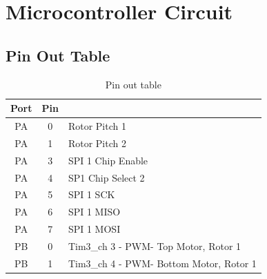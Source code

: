 \chapter{Microcontroller Circuit}
\label{sec: Microcontroller_circuit}
\section{Pin Out Table}
\begin{table}[H]
    \centering
    \small
    \caption{Pin out table}
    \begin{tabular}{|c|c|l|}
    \hline
    \rowcolor[HTML]{EFEFEF} 
    {\color[HTML]{333333} \textbf{Port}} & {\color[HTML]{333333} \textbf{Pin}} & \multicolumn{1}{c|}{\cellcolor[HTML]{EFEFEF}{\color[HTML]{333333} \textbf{Function}}} \\ \hline
    PA                                   & 0                                   & Rotor Pitch 1                                                                         \\ \hline
    PA                                   & 1                                   & Rotor Pitch 2                                                                         \\ \hline
    PA                                   & 3                                   & SPI 1 Chip Enable                                                                     \\ \hline
    PA                                   & 4                                   & SP1   Chip Select 2                                                                   \\ \hline
    PA                                   & 5                                   & SPI 1 SCK                                                                             \\ \hline
    PA                                   & 6                                   & SPI   1 MISO                                                                          \\ \hline
    PA                                   & 7                                   & SPI 1 MOSI                                                                            \\ \hline
    PB                                   & 0                                   & Tim3\_ch 3 - PWM- Top Motor, Rotor   1                                                \\ \hline
    PB                                   & 1                                   & Tim3\_ch 4 - PWM- Bottom Motor,  Rotor 1                                              \\ \hline

\end{tabular}
\end{table}
